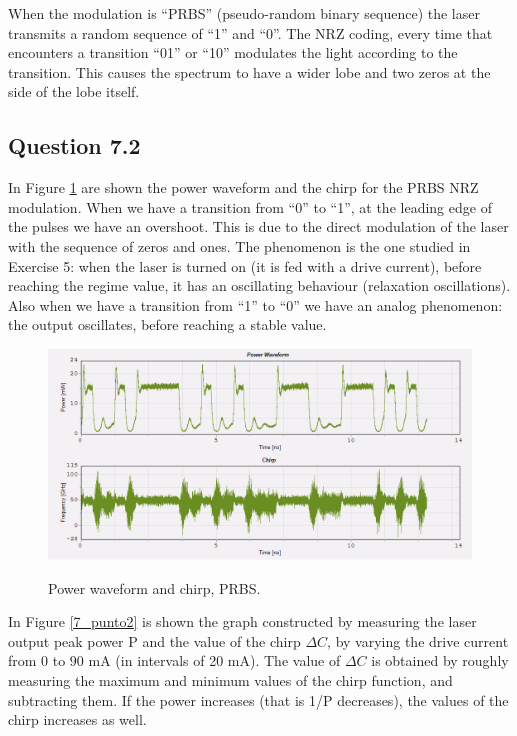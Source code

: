 \documentclass[a4paper,10pt]{report}
\begin{document}
When the modulation is ``PRBS'' (pseudo-random binary sequence) the laser transmits a random sequence of ``1'' and ``0''. The NRZ coding, every time
that encounters a transition ``01'' or ``10'' modulates the light according to the transition. This causes the spectrum to have a wider lobe and
two zeros at the side of the lobe itself.

\subsection*{Question 7.2}
In Figure \ref{7_2} are shown the power waveform and the chirp for the PRBS NRZ modulation.
When we have a transition from ``0'' to ``1'', at the leading edge of the pulses we have an overshoot. This is due to the direct modulation of the laser
with the sequence of zeros and ones. The phenomenon is the one studied in Exercise 5: when the laser is turned on (it is fed with a drive current),
before reaching the regime value, it has an oscillating behaviour (relaxation oscillations). Also when we have a transition from ``1'' to ``0'' we have an analog phenomenon:
the output oscillates, before reaching a stable value.

\begin{figure}[!ht]
  \centering
  \includegraphics[width=12cm]{7_2.png}\\
  \caption{Power waveform and chirp, PRBS.}
  \label{7_2}
\end{figure}

In Figure \ref{7_punto2} is shown the graph constructed by measuring the laser output peak power P and the value of the chirp $\Delta C$, by varying
the drive current from 0 to 90 mA (in intervals of 20 mA).
The value of $\Delta C$ is obtained by roughly measuring the maximum and minimum values of the chirp function, and subtracting them.
If the power increases (that is 1/P decreases), the values of the chirp increases as well.
\end{document}
